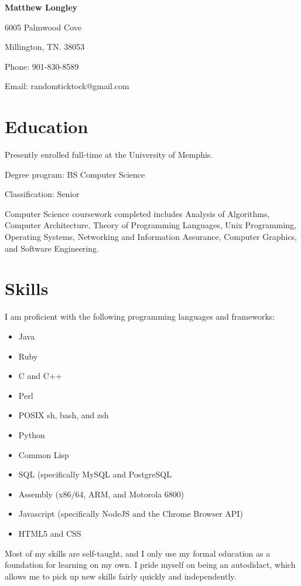 \documentclass{article}
\begin{document}
\begin{singlespace}
\begin{center}
  \textbf{Matthew Longley}
  
  6005 Palmwood Cove
  
  Millington, TN. 38053
  
  Phone: 901-830-8589
  
  Email: randomticktock@gmail.com
\end{center}
\begin{flushleft}
  \section*{Education}
  Presently enrolled full-time at the University of Memphis.

  Degree program: BS Computer Science

  Classification: Senior

  Computer Science coursework completed includes Analysis of Algorithms, Computer Architecture, Theory of Programming Languages, Unix Programming, Operating Systems, Networking and Information Assurance, Computer Graphics, and Software Engineering.
  \section*{Skills}
  I am proficient with the following programming languages and frameworks:
  \begin{itemize}
  \item Java
  \item Ruby
  \item C and C++
  \item Perl
  \item POSIX sh, bash, and zsh
  \item Python
  \item Common Lisp
  \item SQL (specifically MySQL and PostgreSQL
  \item Assembly (x86/64, ARM, and Motorola 6800)
  \item Javascript (specifically NodeJS and the Chrome Browser API)
  \item HTML5 and CSS
  \end{itemize}
  Most of my skills are self-taught, and I only use my formal education as a foundation for learning on my own. I pride myself on being an autodidact, which allows me to pick up new skills fairly quickly and independently.
\end{flushleft}
\end{singlespace}
\end{document}
